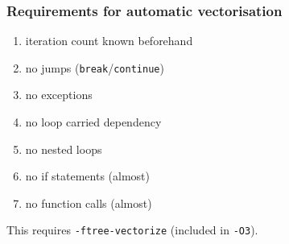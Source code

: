 \documentclass[14pt,aspectratio=169,dvipsnames,table]{beamer}
\begin{document}
\begin{comment}
  \begingroup \setbeamertemplate{footline}{}
  \begin{frame}[noframenumbering]
    \frametitle{Announcements}
    \structure{Coursework}
    \begin{itemize}[wide=0pt]
    \item Submission deadline 21 February 2022
    \item Submission via GitHub Classroom \structure{AND} Blackboard Learn Ultra
    \item If planning to use
      \href{https://www.dur.ac.uk/arc/hamilton/}{hamilton}, start early
    \end{itemize}

    \vskip 8pt

    \structure{Office hours}
    \begin{itemize}[wide=0pt]
    \item Thu 10:00--11:00 \& 12:00--13:00, or appointment via email
    \item In person (office MCS2099) or via Zoom (this meeting)
    \end{itemize}

    \vskip 8pt

    \structure{Feedback}
    \begin{itemize}[wide=0pt]
    \item Anonymously at \url{https://bit.ly/comp3577-21}
    \item Via email or message on Blackboard Learn Ultra
    \end{itemize}

\end{frame}
\endgroup
\end{comment}





\begin{frame}[fragile]
  \frametitle{Requirements for automatic vectorisation}
  \begin{enumerate}[itemsep=8pt]
  \item iteration count known beforehand
  \item no jumps (\verb#break#/\verb#continue#)
  \item no exceptions
  \item no loop carried dependency
  \item no nested loops
  \item no if statements (almost)
  \item no function calls (almost)
  \end{enumerate}

  \vskip 10pt

  This requires \verb#-ftree-vectorize# (included in \verb#-O3#).
  \hfill
  \href{https://godbolt.org/z/rrYqe4rvY}{\faCog}
  \raisebox{1pt}{$\Rightarrow$}
  \href{https://godbolt.org/z/49qd16PTP}{\faCog}
\end{frame}
\end{document}

